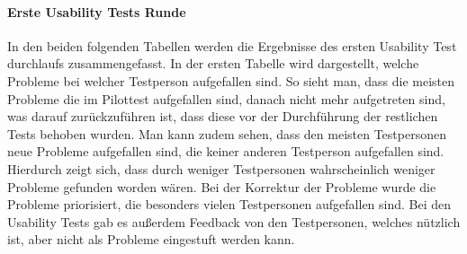 \paragraph{Erste Usability Tests Runde}

In den beiden folgenden Tabellen werden die Ergebnisse des ersten Usability Test durchlaufs zusammengefasst. In der ersten Tabelle wird dargestellt, welche Probleme bei welcher Testperson aufgefallen sind. So sieht man, dass die meisten Probleme die im Pilottest aufgefallen sind, danach nicht mehr aufgetreten sind, was darauf zurückzuführen ist, dass diese vor der Durchführung der restlichen Tests behoben wurden. Man kann zudem sehen, dass den meisten Testpersonen neue Probleme aufgefallen sind, die keiner anderen Testperson aufgefallen sind. Hierdurch zeigt sich, dass durch weniger Testpersonen wahrscheinlich weniger Probleme gefunden worden wären. Bei der Korrektur der Probleme wurde die Probleme priorisiert, die besonders vielen Testpersonen aufgefallen sind. Bei den Usability Tests gab es außerdem Feedback von den Testpersonen, welches nützlich ist, aber nicht als Probleme eingestuft werden kann.

